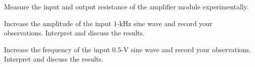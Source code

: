 \documentclass[11pt]{article}
\begin{document}
\begin{question}
\begin{subquestion}{Measure the input and output resistance of the amplifier module experimentally.} 
\answer{}
\end{subquestion}

\begin{subquestion}{Increase the amplitude of the input $1$-kHz sine wave and record your observations. Interpret and discuss the results.} 
\answer{}
\end{subquestion}

\begin{subquestion}{Increase the frequency of the input $0.5$-V sine wave and record your observations. Interpret and discuss the results.} 
\answer{}
\end{subquestion}

\end{question}

\end{document}
